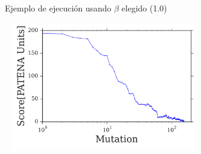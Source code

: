 \documentclass{beamer}
\begin{document}
% 
\begin{frame}[plain]{Ejemplo de ejecución usando $\beta$ elegido (1.0)}
\begin{adjustwidth}{-1.5em}{-2.5em}
\centering

\includegraphics[width=330px,height=210px]{../img/iterationVsScore-individualBeta1-EXAMPLE.png}
\end{adjustwidth}
\end{frame}








% 
\end{document}

